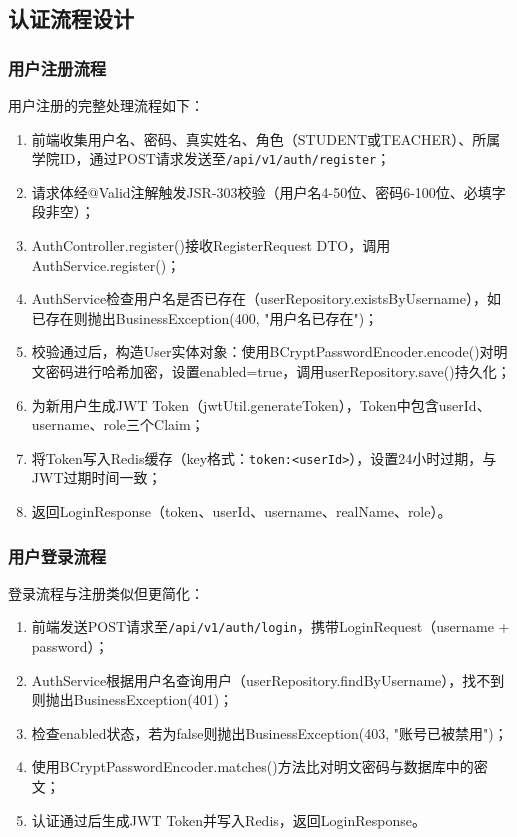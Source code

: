 \subsection{认证流程设计}

\subsubsection{用户注册流程}

用户注册的完整处理流程如下：

\begin{enumerate}
    \item 前端收集用户名、密码、真实姓名、角色（STUDENT或TEACHER）、所属学院ID，通过POST请求发送至\verb|/api/v1/auth/register|；
    \item 请求体经@Valid注解触发JSR-303校验（用户名4-50位、密码6-100位、必填字段非空）；
    \item AuthController.register()接收RegisterRequest DTO，调用AuthService.register()；
    \item AuthService检查用户名是否已存在（userRepository.existsByUsername），如已存在则抛出BusinessException(400, "用户名已存在")；
    \item 校验通过后，构造User实体对象：使用BCryptPasswordEncoder.encode()对明文密码进行哈希加密，设置enabled=true，调用userRepository.save()持久化；
    \item 为新用户生成JWT Token（jwtUtil.generateToken），Token中包含userId、username、role三个Claim；
    \item 将Token写入Redis缓存（key格式：\verb|token:<userId>|），设置24小时过期，与JWT过期时间一致；
    \item 返回LoginResponse（token、userId、username、realName、role）。
\end{enumerate}

\subsubsection{用户登录流程}

登录流程与注册类似但更简化：

\begin{enumerate}
    \item 前端发送POST请求至\verb|/api/v1/auth/login|，携带LoginRequest（username + password）；
    \item AuthService根据用户名查询用户（userRepository.findByUsername），找不到则抛出BusinessException(401)；
    \item 检查enabled状态，若为false则抛出BusinessException(403, "账号已被禁用")；
    \item 使用BCryptPasswordEncoder.matches()方法比对明文密码与数据库中的密文；
    \item 认证通过后生成JWT Token并写入Redis，返回LoginResponse。
\end{enumerate}

